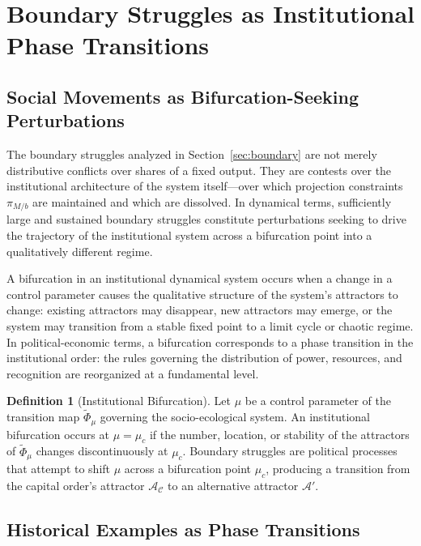 \documentclass[12pt,a4paper]{article}
\theoremstyle{definition}
\newtheorem{definition}{Definition}[section]
\theoremstyle{remark}
\begin{document}
\section{Boundary Struggles as Institutional Phase Transitions}
\label{sec:phase_transitions}

\subsection{Social Movements as Bifurcation-Seeking Perturbations}

The boundary struggles analyzed in Section~\ref{sec:boundary} are not merely distributive conflicts over shares of a fixed output. They are contests over the institutional architecture of the system itself---over which projection constraints $\pi_{M/b}$ are maintained and which are dissolved. In dynamical terms, sufficiently large and sustained boundary struggles constitute perturbations seeking to drive the trajectory of the institutional system across a bifurcation point into a qualitatively different regime.

A bifurcation in an institutional dynamical system occurs when a change in a control parameter causes the qualitative structure of the system's attractors to change: existing attractors may disappear, new attractors may emerge, or the system may transition from a stable fixed point to a limit cycle or chaotic regime. In political-economic terms, a bifurcation corresponds to a phase transition in the institutional order: the rules governing the distribution of power, resources, and recognition are reorganized at a fundamental level.

\begin{definition}[Institutional Bifurcation]
Let $\mu$ be a control parameter of the transition map $\tilde\Phi_\mu$ governing the socio-ecological system. An institutional bifurcation occurs at $\mu = \mu_c$ if the number, location, or stability of the attractors of $\tilde\Phi_\mu$ changes discontinuously at $\mu_c$. Boundary struggles are political processes that attempt to shift $\mu$ across a bifurcation point $\mu_c$, producing a transition from the capital order's attractor $\mathcal{A}_\mathcal{C}$ to an alternative attractor $\mathcal{A}'$.
\end{definition}

\subsection{Historical Examples as Phase Transitions}
\end{document}
